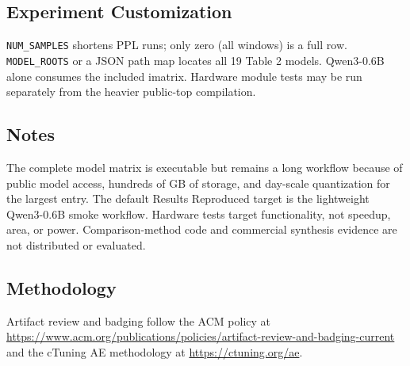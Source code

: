 \subsection{Experiment Customization}
\texttt{NUM\_SAMPLES} shortens PPL runs; only zero (all windows) is a full row.
\texttt{MODEL\_ROOTS} or a JSON path map locates all 19 Table 2 models.
Qwen3-0.6B alone consumes the included imatrix. Hardware module tests may be
run separately from the heavier public-top compilation.

\subsection{Notes}
The complete model matrix is executable but remains a long workflow because of
public model access, hundreds of GB of storage, and day-scale quantization for
the largest entry. The default Results Reproduced target is the lightweight
Qwen3-0.6B smoke workflow. Hardware tests target functionality, not
speedup, area, or power. Comparison-method code and commercial synthesis
evidence are not distributed or evaluated.

\subsection{Methodology}
Artifact review and badging follow the ACM policy at
\url{https://www.acm.org/publications/policies/artifact-review-and-badging-current}
and the cTuning AE methodology at \url{https://ctuning.org/ae}.
